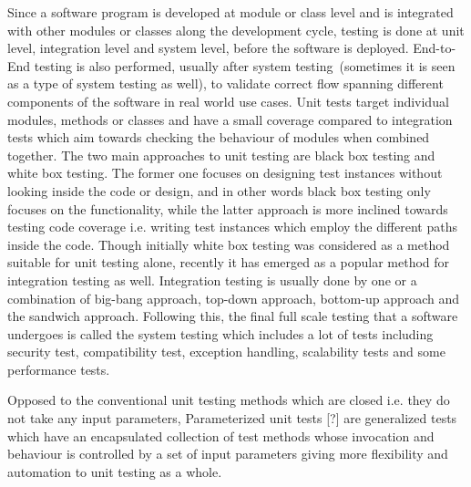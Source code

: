 Since a software program is developed at module or class level and is integrated with other modules or classes along the development cycle, testing is done at unit level, integration level and system level, before the software is deployed. End-to-End testing is also performed, usually after system testing~(sometimes it is seen as a type of system testing as well), to validate correct flow spanning different components of the software in real world use cases. Unit tests target individual modules, methods or classes and have a small coverage compared to integration tests which aim towards checking the behaviour of modules when combined together. The two main approaches to unit testing are black box testing and white box testing. The former one focuses on designing test instances without looking inside the code or design, and in other words black box testing only focuses on the functionality, while the latter approach is more inclined towards testing code coverage i.e. writing test instances which employ the different paths inside the code. Though initially white box testing was considered as a method suitable for unit testing alone, recently it has emerged as a popular method for integration testing as well. Integration testing is usually done by one or a combination of big-bang approach, top-down approach, bottom-up approach and the sandwich approach. Following this, the final full scale testing that a software undergoes is called the system testing which includes a lot of tests including security test, compatibility test, exception handling, scalability tests and some performance tests. 

Opposed to the conventional unit testing methods which are closed i.e. they do not take any input parameters, Parameterized unit tests [?]  %
are generalized tests which have an encapsulated collection of test methods whose invocation and behaviour is controlled by a set of input parameters giving more flexibility and automation to unit testing as a whole. 

